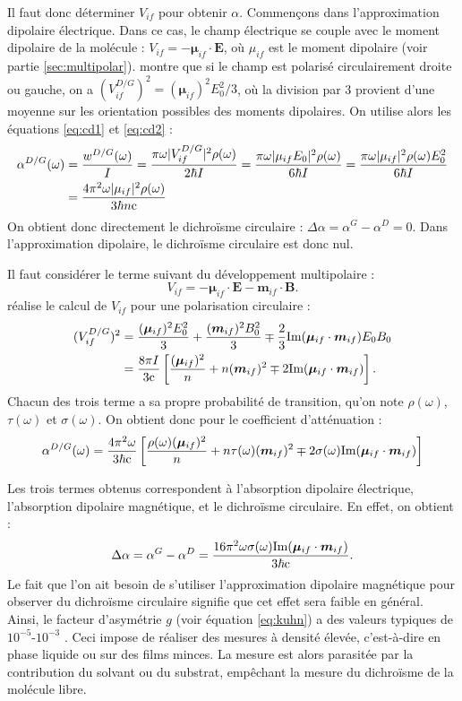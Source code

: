 Il faut donc déterminer $V_{if}$ pour obtenir $\alpha$. Commençons dans l'approximation dipolaire électrique. Dans ce cas, le champ électrique se couple avec le moment dipolaire de la molécule : $V_{if} = -\bm{\mu}_{if}\cdot \bm{E}$, où $\mu_{if}$ est le moment dipolaire (voir partie \ref{sec:multipolar}).  montre que si le champ est polarisé circulairement droite ou gauche, on a $(V_{if}^{D/G})^2 = (\bm{\mu}_{if})^2E^2_0/3$, où la division par 3 provient d'une moyenne sur les orientation possibles des moments dipolaires.
On utilise alors les équations \ref{eq:cd1} et \ref{eq:cd2} :
\begin{align*}
\alpha^{D/G}(\omega) &= \frac{w^{D/G}(\omega)}{I} = \frac{\pi \omega |V_{if}^{D/G}|^2 \rho(\omega)}{2\hbar I} 
= \frac{\pi \omega |\mu_{if}E_0|^2 \rho(\omega)}{6\hbar I} 
= \frac{\pi \omega |\mu_{if}|^2 \rho(\omega)E^2_0}{6\hbar I} \\
&= \frac{4\pi^2 \omega |\mu_{if}|^2 \rho(\omega)}{3\hbar n \mathrm{c}} 
\end{align*}
On obtient donc directement le dichroïsme circulaire : $\Delta\alpha = \alpha^G-\alpha^D = 0$. Dans l'approximation dipolaire, le dichroïsme circulaire est donc nul. \par Il faut considérer le terme suivant du développement multipolaire : 
\[V_{if} = -\bm{\mu}_{if}\cdot \bm{E} - \bm{m}_{if}\cdot \bm{B}.\] 
 réalise le calcul de $V_{if}$ pour une polarisation circulaire :
\begin{align*}
(V_{if}^{D/G})^2 &= \frac{(\bm{\mu}_{if})^2E^2_0}{3}+\frac{(\bm{m}_{if})^2B^2_0}{3} \mp \frac{2}{3}\text{Im}(\bm{\mu}_{if}\cdot\bm{m}_{if})E_0B_0 \\
&= \frac{8\pi I}{3 \mathrm{c}}\left[\frac{(\bm{\mu}_{if})^2}{n} +  n(\bm{m}_{if})^2 \mp 2 \text{Im}(\bm{\mu}_{if}\cdot\bm{m}_{if})\right]. 
\end{align*}
Chacun des trois terme a sa propre probabilité de transition, qu'on note $\rho(\omega)$, $\tau(\omega)$ et $\sigma(\omega)$. On obtient donc pour le coefficient d'atténuation :
\begin{equation*}
\alpha^{D/G}(\omega) = \frac{4\pi^2 \omega}{3\hbar \mathrm{c}}\left[\frac{\rho(\omega)(\bm{\mu}_{if})^2}{n} +  n\tau(\omega)(\bm{m}_{if})^2 \mp 2 \sigma(\omega)\text{Im}(\bm{\mu}_{if}\cdot\bm{m}_{if})\right] 
\end{equation*}

Les trois termes obtenus correspondent à l'absorption dipolaire électrique, l'absorption dipolaire magnétique, et le dichroïsme circulaire. En effet, on obtient :
\[ \Delta \alpha = \alpha^G-\alpha^D = \frac{16\pi^2 \omega\sigma(\omega)\text{Im}(\bm{\mu}_{if}\cdot\bm{m}_{if})}{3\hbar \mathrm{c}}. \]
Le fait que l'on ait besoin de s'utiliser l'approximation dipolaire magnétique pour observer du dichroïsme circulaire signifie que cet effet sera faible en général. Ainsi, le facteur d'asymétrie $g$ (voir équation \ref{eq:kuhn}) a des valeurs typiques de $10^{-5}\text{-}10^{-3}$ . Ceci impose de réaliser des mesures à densité élevée, c'est-à-dire en phase liquide ou sur des films minces. La mesure est alors parasitée par la contribution du solvant ou du substrat, empêchant la mesure du dichroïsme de la molécule libre.

